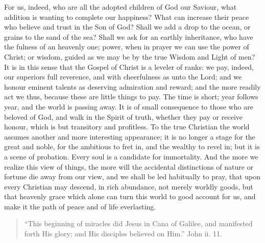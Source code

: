 For us, indeed, who are all the adopted children of God our Saviour,
what addition is wanting to complete our happiness? What can increase
their peace who believe and trust in the Son of God? Shall we add a
drop to the ocean, or grains to the sand of the sea? Shall we ask for
an earthly inheritance, who have the fulness of an heavenly one;
power, when in prayer we can use the power of Christ; or wisdom,
guided as we may be by the true Wisdom and Light of men? It is in this
sense that the Gospel of Christ is a leveler of ranks: we pay, indeed,
our superiors full reverence, and with cheerfulness as unto the Lord;
and we honour eminent talents as deserving admiration and reward; and
the more readily act we thus, because these are little things to pay.
The time is short; year follows year, and the world is passing away.
It is of small consequence to those who are beloved of God, and walk
in the Spirit of truth, whether they pay or receive honour, which is
but transitory and profitless. To the true Christian the world assumes
another and more interesting appearance; it is no longer a stage for
the great and noble, for the ambitious to fret in, and the wealthy to
revel in; but it is a scene of probation. Every soul is a candidate
for immortality. And the more we realize this view of things, the more
will the accidental distinctions of nature or fortune die away from
our view, and we shall be led habitually to pray, that upon every
Christian may descend, in rich abundance, not merely worldly goods,
but that heavenly grace which alone can turn this world to good
account for us, and make it the path of peace and of life everlasting.


\begin{quote}

``This beginning of miracles did Jesus in Cana of Galilee,
and manifested forth His glory; and His disciples believed on
Him.'' John ii. 11.

\end{quote}


